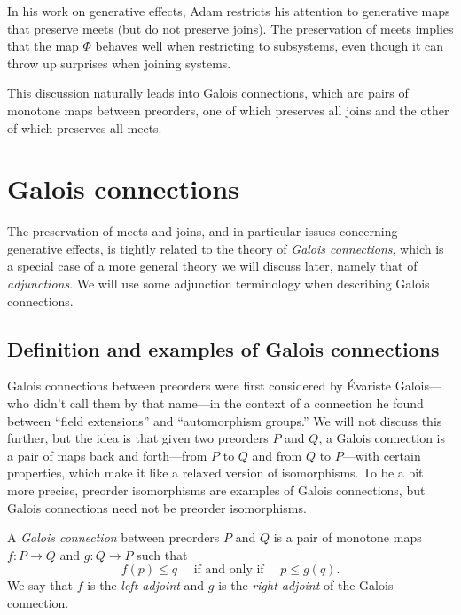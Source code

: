 \documentclass[7Sketches]{subfiles}
\begin{document}
In his work on generative effects, Adam restricts his attention to generative maps that
preserve meets (but do not preserve joins). The preservation of meets
implies that the map $\Phi$ behaves well when restricting to subsystems, even
though it can throw up surprises when joining systems.

This discussion naturally leads into Galois connections, which are pairs of monotone maps between preorders, one of which preserves all joins and the other of which preserves all meets.

\section{Galois connections} %
\label{sec.galois_connections}%
%

The preservation of meets and joins, and in particular issues concerning generative effects, is tightly related to the theory of \emph{Galois connections}, which is a special case of a more general theory we will discuss later, namely that of \emph{adjunctions}. We will use some adjunction terminology when describing Galois connections.

\subsection{Definition and examples of Galois connections}%
\label{subsec.def_ex_Galois}
Galois connections between preorders were first considered by \'Evariste
Galois---who didn't call them by that name---in the context of a connection he
found between ``field extensions'' and ``automorphism groups.'' We will not
discuss this further, but the idea is that given two preorders $P$ and $Q$, a
Galois connection is a pair of maps back and forth---from $P$ to $Q$ and from
$Q$ to $P$---with certain properties, which make it like a relaxed version of
isomorphisms. To be a bit more precise, preorder isomorphisms are examples of
Galois connections, but Galois connections need not be preorder isomorphisms.%

\begin{definition}%
\label{def.galois}%
%
A \emph{Galois connection} between preorders $P$ and $Q$ is a pair of monotone maps
$f\colon P \to Q$ and $g\colon Q \to P$ such that 
\begin{equation}%
\label{eqn.galois_connection}
  f(p) \le q \quad\text{ if and only if }\quad p \le g(q).
\end{equation}
We say that $f$ is the \emph{left adjoint} and $g$ is the \emph{right adjoint}
of the Galois connection.
\end{definition}
\end{document}
